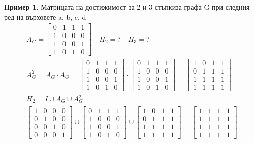 \documentclass[fleqn, 12pt]{article}
\theoremstyle{definition}
\newtheorem{example}{Пример}[subsection]
\begin{document}
\begin{example}
Матрицата на достижимост за 2 и 3 стъпкиза графа G при следния ред на върховете a, b, c, d
\begin{gather*}
A_G = 
\left[
\begin{matrix}
0& 1 & 1 & 1 \\
1 & 0 & 0 & 0 \\
1 & 0 & 0 & 1\\
1 & 0 & 1 & 0
\end{matrix} 
\right] \quad H_2 =? \quad H_3 = ? \\
A_G ^2 = A_G \cdot A_G = 
\left[
\begin{matrix}
0& 1 & 1 & 1 \\
1 & 0 & 0 & 0 \\
1 & 0 & 0 & 1\\
1 & 0 & 1 & 0
\end{matrix} 
\right] 
\cdot 
\left[
\begin{matrix}
0& 1 & 1 & 1 \\
1 & 0 & 0 & 0 \\
1 & 0 & 0 & 1\\
1 & 0 & 1 & 0
\end{matrix} 
\right] = 
\left[
\begin{matrix}
1& 0 & 1 & 1 \\
0 & 1 & 1 & 1 \\
1 & 1 & 1 & 1\\
1 & 1 & 1 & 1
\end{matrix} 
\right] \\
H_2 = I \cup A_G \cup A_G^2 = \\
\left[
\begin{matrix}
1 & 0 & 0 & 0 \\
0 & 1 & 0 & 0 \\
0 & 0 & 1 & 0\\
0 & 0 & 0 & 1
\end{matrix} 
\right]
\cup
\left[
\begin{matrix}
0& 1 & 1 & 1 \\
1 & 0 & 0 & 0 \\
1 & 0 & 0 & 1\\
1 & 0 & 1 & 0
\end{matrix} 
\right]
\cup 
\left[
\begin{matrix}
1& 0 & 1 & 1 \\
0 & 1 & 1 & 1 \\
1 & 1 & 1 & 1\\
1 & 1 & 1 & 1
\end{matrix} 
\right]
=
\left[
\begin{matrix}
1& 1 & 1 & 1 \\
1 & 1 & 1 & 1 \\
1 & 1 & 1 & 1\\
1 & 1 & 1 & 1
\end{matrix} 
\right]
\end{gather*}


\end{example}
\end{document}
